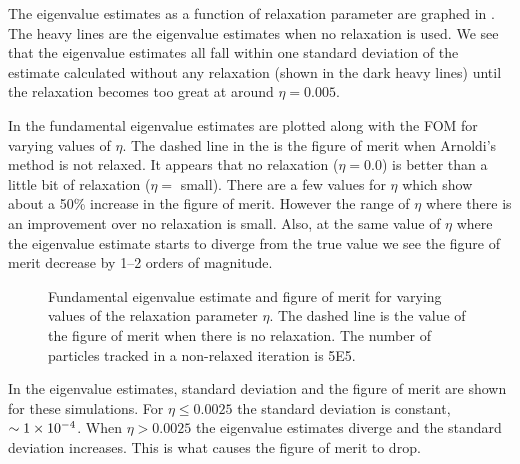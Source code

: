 The eigenvalue estimates as a function of relaxation parameter are graphed in .  The heavy lines are the eigenvalue estimates when no relaxation is used.    We see that the eigenvalue estimates all fall within one standard deviation of the estimate calculated without any relaxation (shown in the dark heavy lines) until the relaxation becomes too great at around \mbox{$\eta = 0.005$}.  

In  the fundamental eigenvalue estimates are plotted along with the FOM for varying values of $\eta$.  The dashed line in the  is the figure of merit when Arnoldi's method is not relaxed.  It appears that no relaxation ($\eta = 0.0$) is better than a little bit of relaxation ($\eta = $ small).  There are a few values for $\eta$ which show about a 50\% increase in the figure of merit.  However the range of $\eta$ where there is an improvement over no relaxation is small.  Also, at the same value of $\eta$ where the eigenvalue estimate starts to diverge from the true value we see the figure of merit decrease by 1--2 orders of magnitude.  
\begin{sidewaysfigure}\centering
    
    \caption{Fundamental eigenvalue estimate and figure of merit for varying values of the relaxation parameter $\eta$.  The dashed line is the value of the figure of merit when there is no relaxation.  The number of particles tracked in a non-relaxed iteration is 5E5.}
    \label{fig:MoreAggFOM}
\end{sidewaysfigure}

In  the eigenvalue estimates, standard deviation and the figure of merit are shown for these simulations.  For \mbox{$\eta \leq 0.0025$} the standard deviation is constant, \mbox{$\sim 1\times 10^{-4}$}.  When \mbox{$\eta > 0.0025$} the eigenvalue estimates diverge and the standard deviation increases.  This is what causes the figure of merit to drop.  

